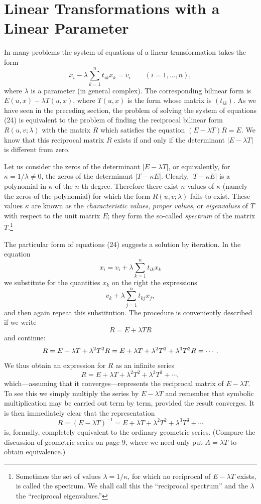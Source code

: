 \section{Linear Transformations with a Linear Parameter}
In many problems the system of equations of a linear transformation takes the form
\begin{equation*}
 x_i-\lambda\sum_{k=1}^{n}t_{ik}x_k=v_i\qquad(i=1,\ldots,n),
 \tag{24}
\end{equation*}
where $\lambda$ is a parameter (in general complex). The corresponding bilinear form is $E(u,x)-\lambda T(u,x)$, where $T(u,x)$ is the form whose matrix is $(t_{ik})$. As we have seen in the preceding section, the problem of solving the system of equations (24) is equivalent to the problem of finding the reciprocal bilinear form $R(u,v;\lambda)$ with the matrix $R$ which satisfies the equation $(E-\lambda T)R=E$. We know that this reciprocal matrix $R$ exists if and only if the determinant $|E-\lambda T|$ is different from zero.

Let us consider the zeros of the determinant $|E-\lambda T|$, or equivalently, for $\kappa=1/\lambda\ne0$, the zeros of the determinant $|T-\kappa E|$. Clearly, $|T-\kappa E|$ is a polynomial in $\kappa$ of the $n$-th degree. Therefore there exist $n$ values of $\kappa$ (namely the zeros of the polynomial) for which the form $R(u,v;\lambda)$ fails to exist. These values $\kappa$ are known as the \emph{characteristic values}, \emph{proper values}, or \emph{eigenvalues} of $T$ with respect to the unit matrix $E$; they form the so-called \emph{spectrum} of the matrix $T$.\footnote{Sometimes the set of values $\lambda=1/\kappa$, for which no reciprocal of $E-\lambda T$ exists, is called the spectrum. We shall call this the ``reciprocal spectrum'' and the $\lambda$ the ``reciprocal eigenvalues.''}

The particular form of equations (24) suggests a solution by iteration. In the equation
\[
 x_i=v_i+\lambda\sum_{k=1}^{n}t_{ik}x_k
\]
we substitute for the quantities $x_k$ on the right the expressions
\[
 v_k+\lambda\sum_{j=1}^{n}t_{kj}x_j,
\]
and then again repeat this substitution. The procedure is conveniently described if we write
\[
 R=E+\lambda TR
\]
and continue:
\[
 R=E+\lambda T+\lambda^2T^2R\\
   =E+\lambda T+\lambda^2T^2+\lambda^3T^3R=\cdots .
\]
We thus obtain an expression for $R$ as an infinite series
\[
 R=E+\lambda T+\lambda^2T^2+\lambda^3T^3+\cdots,
\]
which---assuming that it converges---represents the reciprocal matrix of $E-\lambda T$. To see this we simply multiply the series by $E-\lambda T$ and remember that symbolic multiplication may be carried out term by term, provided the result converges. It is then immediately clear that the representation
\[
 R=(E-\lambda T)^{-1}=E+\lambda T+\lambda^2T^2+\lambda^3T^3+\cdots
\]
is, formally, completely equivalent to the ordinary geometric series. (Compare the discussion of geometric series on page 9, where we need only put $A=\lambda T$ to obtain equivalence.)

